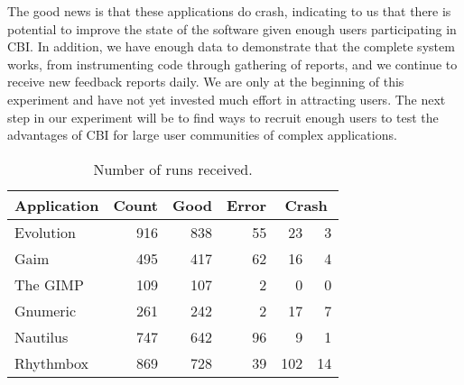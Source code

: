 \documentclass[10pt,twocolumn]{article}
\newcommand{\evolution}{Evolution\xspace}
\newcommand{\gaim}{Gaim\xspace}
\newcommand{\gimp}{The GIMP\xspace}
\newcommand{\gnumeric}{Gnumeric\xspace}
\newcommand{\nautilus}{Nautilus\xspace}
\newcommand{\rhythmbox}{Rhythmbox\xspace}
\newcommand{\header}[1]{\multicolumn{1}{c}{\textbf{#1}}}
\begin{document}
The good news is that these applications do crash,
indicating to us that there is potential to improve the state
of the software given enough users participating in CBI\@.  In addition,
we have enough data to demonstrate that the complete system works, from
instrumenting code through gathering of reports, and we continue to
receive new feedback reports daily.  We are only at the beginning of this
experiment and have not yet invested much effort in attracting users. 
The next step in our experiment will be
to find ways to recruit enough users to test the advantages of CBI
for large user communities of complex applications.


\begin{table}
  \centering
  \begin{tabular}{lrrrr@{\ (}r@{\%)}}
    \header{Application} & \header{Count} & \header{Good} & \header{Error} & \multicolumn{2}{c}{\textbf{Crash}} \\ \hline
    \evolution & 916 & 838 & 55 & 23 & 3 \\
    \gaim & 495 & 417 & 62 & 16 & 4 \\
    \gimp & 109 & 107 & 2 & 0 & 0 \\
    \gnumeric & 261 & 242 & 2 & 17 & 7 \\
    \nautilus & 747 & 642 & 96 & 9 & 1 \\
    \rhythmbox & 869 & 728 & 39 & 102 & 14
  \end{tabular}
  \caption{Number of runs received.}
  \label{reports-per-app}
\end{table}


\end{document}
